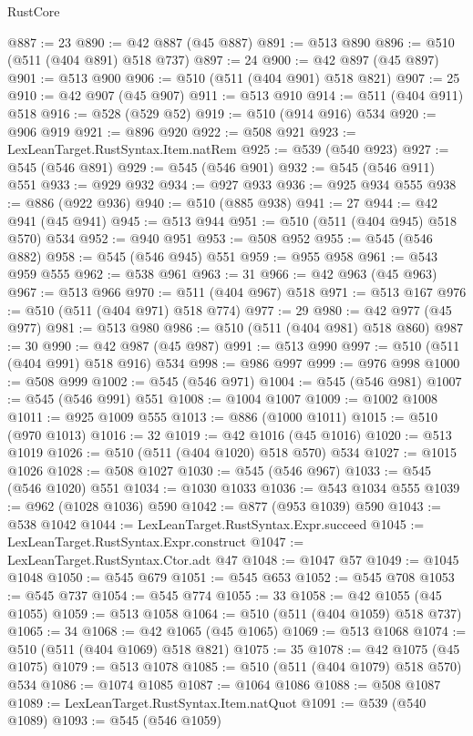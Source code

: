 \begin{lexlean}{RustCore}
\begin{coremodule}
@887 := 23
@890 := @42 @887 (@45 @887)
@891 := @513 @890
@896 := @510 (@511 (@404 @891) @518 @737)
@897 := 24
@900 := @42 @897 (@45 @897)
@901 := @513 @900
@906 := @510 (@511 (@404 @901) @518 @821)
@907 := 25
@910 := @42 @907 (@45 @907)
@911 := @513 @910
@914 := @511 (@404 @911) @518
@916 := @528 (@529 @52)
@919 := @510 (@914 @916) @534
@920 := @906 @919
@921 := @896 @920
@922 := @508 @921
@923 := LexLeanTarget.RustSyntax.Item.natRem
@925 := @539 (@540 @923)
@927 := @545 (@546 @891)
@929 := @545 (@546 @901)
@932 := @545 (@546 @911) @551
@933 := @929 @932
@934 := @927 @933
@936 := @925 @934 @555
@938 := @886 (@922 @936)
@940 := @510 (@885 @938)
@941 := 27
@944 := @42 @941 (@45 @941)
@945 := @513 @944
@951 := @510 (@511 (@404 @945) @518 @570) @534
@952 := @940 @951
@953 := @508 @952
@955 := @545 (@546 @882)
@958 := @545 (@546 @945) @551
@959 := @955 @958
@961 := @543 @959 @555
@962 := @538 @961
@963 := 31
@966 := @42 @963 (@45 @963)
@967 := @513 @966
@970 := @511 (@404 @967) @518
@971 := @513 @167
@976 := @510 (@511 (@404 @971) @518 @774)
@977 := 29
@980 := @42 @977 (@45 @977)
@981 := @513 @980
@986 := @510 (@511 (@404 @981) @518 @860)
@987 := 30
@990 := @42 @987 (@45 @987)
@991 := @513 @990
@997 := @510 (@511 (@404 @991) @518 @916) @534
@998 := @986 @997
@999 := @976 @998
@1000 := @508 @999
@1002 := @545 (@546 @971)
@1004 := @545 (@546 @981)
@1007 := @545 (@546 @991) @551
@1008 := @1004 @1007
@1009 := @1002 @1008
@1011 := @925 @1009 @555
@1013 := @886 (@1000 @1011)
@1015 := @510 (@970 @1013)
@1016 := 32
@1019 := @42 @1016 (@45 @1016)
@1020 := @513 @1019
@1026 := @510 (@511 (@404 @1020) @518 @570) @534
@1027 := @1015 @1026
@1028 := @508 @1027
@1030 := @545 (@546 @967)
@1033 := @545 (@546 @1020) @551
@1034 := @1030 @1033
@1036 := @543 @1034 @555
@1039 := @962 (@1028 @1036) @590
@1042 := @877 (@953 @1039) @590
@1043 := @538 @1042
@1044 := LexLeanTarget.RustSyntax.Expr.succeed
@1045 := LexLeanTarget.RustSyntax.Expr.construct
@1047 := LexLeanTarget.RustSyntax.Ctor.adt @47
@1048 := @1047 @57
@1049 := @1045 @1048
@1050 := @545 @679
@1051 := @545 @653
@1052 := @545 @708
@1053 := @545 @737
@1054 := @545 @774
@1055 := 33
@1058 := @42 @1055 (@45 @1055)
@1059 := @513 @1058
@1064 := @510 (@511 (@404 @1059) @518 @737)
@1065 := 34
@1068 := @42 @1065 (@45 @1065)
@1069 := @513 @1068
@1074 := @510 (@511 (@404 @1069) @518 @821)
@1075 := 35
@1078 := @42 @1075 (@45 @1075)
@1079 := @513 @1078
@1085 := @510 (@511 (@404 @1079) @518 @570) @534
@1086 := @1074 @1085
@1087 := @1064 @1086
@1088 := @508 @1087
@1089 := LexLeanTarget.RustSyntax.Item.natQuot
@1091 := @539 (@540 @1089)
@1093 := @545 (@546 @1059)

\end{coremodule}
\end{lexlean}
